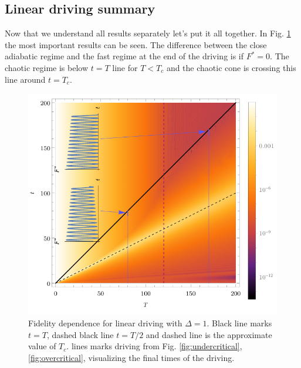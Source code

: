 \subsection{Linear driving summary}
Now that we understand all results separately let's put it all together. In Fig. \ref{fig:AllInOne} the most important results can be seen. The difference between the close adiabatic regime and the fast regime at the end of the driving is if $F^*=0$. The chaotic regime is below $t=T$ line for $T<T_c$ and the chaotic cone is crossing this line around $t=T_c$.
\begin{figure}[h]
    \centering 
    \vspace{-2pt}\includegraphics[scale=1.2]{../img/allInOne.pdf}
    \vspace{-17pt}\caption{Fidelity dependence for linear driving with $\Delta=1$. Black line marks $t=T$, dashed black line $t=T/2$ and  dashed line is the approximate value of $T_c$.  lines marks driving from Fig. \ref{fig:undercritical}, \ref{fig:overcritical}, visualizing the final times of the driving.}
    \label{fig:AllInOne}
\end{figure}
